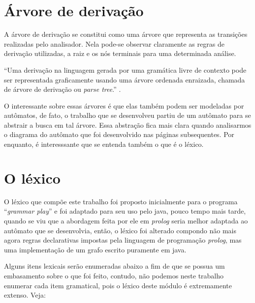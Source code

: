 \documentclass[12pt,a4paper,oneside,english,brazilian,brazil]{abntex2}
\begin{document}
\section{Árvore de derivação}

\par A árvore de derivação se constitui como uma árvore que representa as transições realizadas pelo analisador. Nela pode-se observar claramente as regras de derivação utilizadas, a raiz e os nós terminais para uma determinada análise.  \

\begin{citacao}
``Uma derivação na linguagem gerada por uma gramática livre de contexto pode ser representada graficamente usando uma árvore ordenada enraizada, chamada de árvore de derivação ou \textit{parse tree}.'' \cite{matdiscreta1}.
\end{citacao}


\par O interessante sobre essas árvores é que elas também podem ser modeladas por autômatos, de fato, o trabalho que se desenvolveu partiu de um autômato para se abstrair a busca em tal árvore. Essa abstração fica mais clara quando analisarmos o diagrama do autômato que foi desenvolvido nas páginas subsequentes. Por enquanto, é interesssante que se entenda também o que é o léxico. \

\section{O léxico}

\par O léxico que compõe este trabalho foi proposto inicialmente para o programa ``\textit{grammar play}'' \cite{othero2} e foi adaptado para seu uso pelo java, pouco tempo mais tarde, quando se viu que a abordagem feita por ele em \textit{prolog} seria melhor adaptada ao  autômato que se desenvolvia, então, o léxico foi alterado compondo não mais agora regras declarativas impostas pela linguagem de programação \textit{prolog}, mas uma implementação de um grafo escrito puramente em java.\

\par Alguns itens lexicais serão enumeradas abaixo a fim de que se possua um embasamento sobre o que foi feito, contudo, não podemos neste trabalho enumerar cada item gramatical, pois o léxico deste módulo é extremamente extenso. Veja: \
\end{document}
